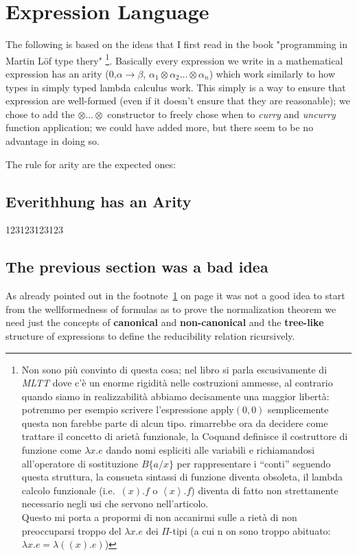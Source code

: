 \documentclass[11pt,a5paper,draft,oneside]{amsbook}
\newcommand{\femph}{\textbf}
\begin{document}
\chapter{Expression Language}
	The following is based on the ideas that I first read in the book "programming in Martin Löf type thery" 
	\footnote{\label{qwe13}Non sono più convinto di questa cosa; nel libro si parla escusivamente di \emph{MLTT} dove c'è un enorme rigidità nelle costruzioni ammesse, al contrario quando siamo in realizzabilità abbiamo decisamente una maggior libertà: potremmo per esempio scrivere l'espressione $\text{apply}(0,0)$ semplicemente questa non farebbe parte di alcun tipo.
	rimarrebbe ora da decidere come trattare il concetto di arietà funzionale, la Coquand definisce il costruttore di funzione come $\lambda x . e$ dando nomi espliciti alle variabili e richiamandosi all'operatore di sostituzione $B\{a/x\}$ per rappresentare i ``conti'' seguendo questa struttura, la consueta sintassi di funzione diventa obsoleta, il lambda calcolo funzionale (i.e.\ $(x).f$ o $\left\langle x\right\rangle.f$) diventa di fatto non strettamente necessario negli usi che servono nell'articolo. \\
	Questo mi porta a propormi di non accanirmi sulle a
	rietà di non preoccuparsi troppo del $\lambda x.e$ dei $\Pi$-tipi (a cui n
	on sono troppo abituato: $\lambda x.e 
	= \lambda ((x).e)$) 
	}. 
	Basically every expression we write in a mathematical expression has an arity (0,$\alpha\rightarrow\beta$, $\alpha_1\otimes\alpha_2\ldots\otimes\alpha_n$) which work similarly to how types in simply typed lambda calculus work. 
	This simply is a way to ensure that expression are well-formed (even if it doesn't ensure that they are reasonable); we chose to add the $\otimes\ldots\otimes$ constructor to freely chose when to \emph{curry} and \emph{uncurry} function application; we could have added more, but there seem to be no advantage in doing so.
	
	The rule for arity are the expected ones:
	
	\section{Everithhung has an Arity} 
		123123123123
	\section{The previous section was a bad idea}
		As already pointed out in the footnote~\ref{qwe13} on page \pageref{qwe13} it was not a good idea to start from the wellformedness of formulas as to prove the normalization theorem we need just the concepts of \femph{canonical} 
		and \femph{non-canonical} and the \femph{tree-like} structure of expressions to define the reducibility relation ricursively.
		
\end{document}

